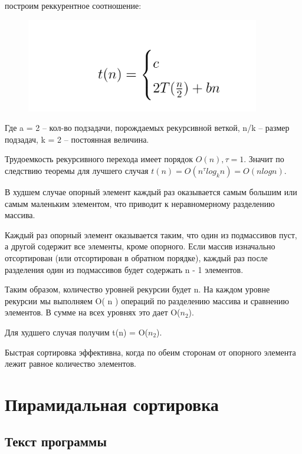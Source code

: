 \documentclass[bachelor, och, referat, times]{SCWorks}
\begin{document}
    построим реккурентное соотношение:


    \begin{figure} [H]
        \centering
    \includegraphics[width=0.50\linewidth]{Снимок экрана 2025-08-10 214221.png}
    \label{fig:first}
    \end{figure}

    Где a = 2 – кол-во подзадачи, порождаемых рекурсивной веткой, 
    n/k – размер подзадач, k = 2 – постоянная величина.

    Трудоемкость рекурсивного перехода имеет порядок $O(n), \tau  = 1.$
Значит по следствию теоремы для лучшего случая $ t(n) = O(n^\tau log_kn) = O(nlogn).$


В худшем случае опорный элемент каждый раз оказывается 
самым большим или самым маленьким элементом, 
что приводит к неравномерному разделению массива. 

Каждый раз опорный элемент оказывается таким, 
что один из подмассивов пуст, а другой содержит все элементы, кроме опорного. 
Если массив изначально отсортирован (или отсортирован в обратном порядке), 
каждый раз после разделения один из подмассивов 
будет содержать n - 1 элементов. 

Таким образом, количество уровней рекурсии будет n. 
На каждом уровне рекурсии мы выполняем O( n ) операций по разделению массива 
и сравнению элементов. В сумме на всех уровнях это дает O($n_2$).

Для худшего случая получим t(n) = O($n_2$).

Быстрая сортировка эффективна, 
когда по обеим сторонам от опорного элемента лежит равное количество элементов.



\section{Пирамидальная сортировка}
\subsection{Текст программы}
\end{document}
